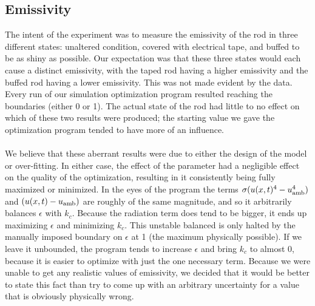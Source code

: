 \documentclass[letterpaper,titlepage,oneside]{report}
\begin{document}
\subsection*{Emissivity}
\label{sec:emiss}
The intent of the experiment was to measure the emissivity of the
rod in three different states: unaltered condition,
covered with electrical tape, and buffed to be as shiny as possible.
Our expectation was that these three states would each cause
a distinct emissivity, with the taped rod having a higher
emissivity and the buffed rod having a lower emissivity.
This was not made evident by the data. Every run of our
simulation optimization program resulted reaching the boundaries
(either 0 or 1). The actual state of the rod had little to no
effect on which of these two results were produced;
the starting value we gave the optimization program tended to have
more of an influence.
\\\\
We believe that these aberrant results were due to either the design
of the model or over-fitting. In either case, the effect of the
parameter had a negligible effect on the quality of the optimization,
resulting in it consistently being fully maximized or minimized.
In the eyes of the program the terms $\sigma(u(x,t)^4-u_{\rm{amb}}^4)$
and $(u(x,t)-u_{\rm{amb}})$ are roughly of the same magnitude,
and so it arbitrarily balances $\epsilon$ with $k_c$. Because the
radiation term does tend to be bigger, it ends up 
maximizing $\epsilon$ and minimizing $k_c$. This unstable balanced is only
halted by the manually imposed boundary on $\epsilon$ at 1
(the maximum physically possible). If we leave it unbounded,
the program tends to increase $\epsilon$ and bring $k_c$ to almost 0,
because it is easier to optimize with just the one necessary term.
Because we were unable to get any realistic values of emissivity,
we decided that it would be better to state this fact than try to
come up with an arbitrary uncertainty for a value that is
obviously physically wrong.
\end{document}
